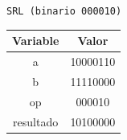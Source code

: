 \documentclass[letterpaper]{sae}
\begin{document}
\begin{figure}[H] %
\label{fig:test8}
\end{figure}

\verb+SRL (binario 000010)+\\

\begin{center}
	\begin{tabular}{|c|c|}
		\hline 
		Variable & Valor\tabularnewline
		\hline 
		\hline 
		a & 10000110\tabularnewline
		\hline 
		b & 11110000\tabularnewline
		\hline 
		op & 000010\tabularnewline
		\hline 
		resultado & 10100000\tabularnewline
		\hline 
	\end{tabular}
\end{center}
\end{document}
